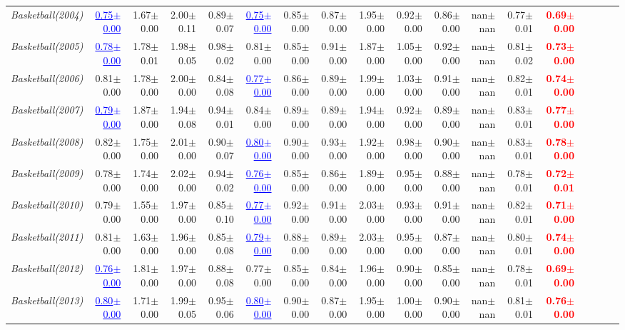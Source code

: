 \documentclass[nohyperref]{article}
\theoremstyle{plain}
\theoremstyle{definition}
\theoremstyle{remark}
\newcommand{\red}[1]{\textcolor{red}{\textbf{#1}}}
\newcommand{\blue}[1]{\textcolor{blue}{\underline{#1}}}
\begin{document}
\begin{table*}[!ht]
{\begin{tabular}{lrrrrrrrrrrrrrrrrr}
			{\it Basketball(2004)} & \blue{0.75$\pm$0.00} & 1.67$\pm$0.00 & 2.00$\pm$0.11 & 0.89$\pm$0.07 & \blue{0.75$\pm$0.00} & 0.85$\pm$0.00 & 0.87$\pm$0.00 & 1.95$\pm$0.00 & 0.92$\pm$0.00 & 0.86$\pm$0.00 & nan$\pm$nan & 0.77$\pm$0.01 & \red{0.69$\pm$0.00} \\
			{\it Basketball(2005)} & \blue{0.78$\pm$0.00} & 1.78$\pm$0.01 & 1.98$\pm$0.05 & 0.98$\pm$0.02 & 0.81$\pm$0.00 & 0.85$\pm$0.00 & 0.91$\pm$0.00 & 1.87$\pm$0.00 & 1.05$\pm$0.00 & 0.92$\pm$0.00 & nan$\pm$nan & 0.81$\pm$0.02 & \red{0.73$\pm$0.00} \\
			{\it Basketball(2006)} & 0.81$\pm$0.00 & 1.78$\pm$0.00 & 2.00$\pm$0.00 & 0.84$\pm$0.08 & \blue{0.77$\pm$0.00} & 0.86$\pm$0.00 & 0.89$\pm$0.00 & 1.99$\pm$0.00 & 1.03$\pm$0.00 & 0.91$\pm$0.00 & nan$\pm$nan & 0.82$\pm$0.01 & \red{0.74$\pm$0.00} \\
			{\it Basketball(2007)} & \blue{0.79$\pm$0.00} & 1.87$\pm$0.00 & 1.94$\pm$0.08 & 0.94$\pm$0.01 & 0.84$\pm$0.00 & 0.89$\pm$0.00 & 0.89$\pm$0.00 & 1.94$\pm$0.00 & 0.92$\pm$0.00 & 0.89$\pm$0.00 & nan$\pm$nan & 0.83$\pm$0.01 & \red{0.77$\pm$0.00} \\
			{\it Basketball(2008)} & 0.82$\pm$0.00 & 1.75$\pm$0.00 & 2.01$\pm$0.00 & 0.90$\pm$0.07 & \blue{0.80$\pm$0.00} & 0.90$\pm$0.00 & 0.93$\pm$0.00 & 1.92$\pm$0.00 & 0.98$\pm$0.00 & 0.90$\pm$0.00 & nan$\pm$nan & 0.83$\pm$0.01 & \red{0.78$\pm$0.00} \\
			{\it Basketball(2009)} & 0.78$\pm$0.00 & 1.74$\pm$0.00 & 2.02$\pm$0.00 & 0.94$\pm$0.02 & \blue{0.76$\pm$0.00} & 0.85$\pm$0.00 & 0.86$\pm$0.00 & 1.89$\pm$0.00 & 0.95$\pm$0.00 & 0.88$\pm$0.00 & nan$\pm$nan & 0.78$\pm$0.01 & \red{0.72$\pm$0.01} \\
			{\it Basketball(2010)} & 0.79$\pm$0.00 & 1.55$\pm$0.00 & 1.97$\pm$0.00 & 0.85$\pm$0.10 & \blue{0.77$\pm$0.00} & 0.92$\pm$0.00 & 0.91$\pm$0.00 & 2.03$\pm$0.00 & 0.93$\pm$0.00 & 0.91$\pm$0.00 & nan$\pm$nan & 0.82$\pm$0.01 & \red{0.71$\pm$0.00} \\
			{\it Basketball(2011)} & 0.81$\pm$0.00 & 1.63$\pm$0.00 & 1.96$\pm$0.00 & 0.85$\pm$0.08 & \blue{0.79$\pm$0.00} & 0.88$\pm$0.00 & 0.89$\pm$0.00 & 2.03$\pm$0.00 & 0.95$\pm$0.00 & 0.87$\pm$0.00 & nan$\pm$nan & 0.80$\pm$0.01 & \red{0.74$\pm$0.00} \\
			{\it Basketball(2012)} & \blue{0.76$\pm$0.00} & 1.81$\pm$0.00 & 1.97$\pm$0.00 & 0.88$\pm$0.08 & 0.77$\pm$0.00 & 0.85$\pm$0.00 & 0.84$\pm$0.00 & 1.96$\pm$0.00 & 0.90$\pm$0.00 & 0.85$\pm$0.00 & nan$\pm$nan & 0.78$\pm$0.01 & \red{0.69$\pm$0.00} \\
			{\it Basketball(2013)} & \blue{0.80$\pm$0.00} & 1.71$\pm$0.00 & 1.99$\pm$0.05 & 0.95$\pm$0.06 & \blue{0.80$\pm$0.00} & 0.90$\pm$0.00 & 0.87$\pm$0.00 & 1.95$\pm$0.00 & 1.00$\pm$0.00 & 0.90$\pm$0.00 & nan$\pm$nan & 0.81$\pm$0.01 & \red{0.76$\pm$0.00} \\

\end{tabular}}
\end{table*}
\end{document}
